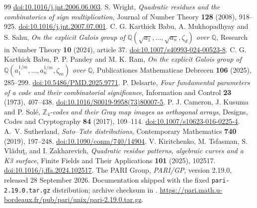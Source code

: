\documentclass[11pt]{article}
\theoremstyle{definition}\newtheorem{definition}[theorem]{Definition}
\newcommand{\Q}{\mathbb Q}
\newcommand{\Z}{\mathbb Z}
\begin{document}
\begin{thebibliography}{99}
\href{https://doi.org/10.1016/j.jnt.2006.06.003}{doi:10.1016/j.jnt.2006.06.003}.
 S. Wright,
\emph{Quadratic residues and the combinatorics of sign multiplication},
Journal of Number Theory \textbf{128} (2008), 918--925.
\href{https://doi.org/10.1016/j.jnt.2007.07.001}{doi:10.1016/j.jnt.2007.07.001}.
 C. G. Karthick Babu, A. Mukhopadhyay and S. Sahu,
\emph{On the explicit Galois group of
$\Q(\sqrt{a_1},\ldots,\sqrt{a_n},\zeta_d)$ over $\Q$},
Research in Number Theory \textbf{10} (2024), article 37.
\href{https://doi.org/10.1007/s40993-024-00523-8}{doi:10.1007/s40993-024-00523-8}.
 C. G. Karthick Babu, P. P. Pandey and M. K. Ram,
\emph{On the explicit Galois group of
$\Q(a_1^{1/m},\ldots,a_n^{1/m},\zeta_m)$ over $\Q$},
Publicationes Mathematicae Debrecen \textbf{106} (2025), 285--299.
\href{https://doi.org/10.5486/PMD.2025.9771}{doi:10.5486/PMD.2025.9771}.
 P. Delsarte,
\emph{Four fundamental parameters of a code and their combinatorial significance},
Information and Control \textbf{23} (1973), 407--438.
\href{https://doi.org/10.1016/S0019-9958(73)80007-5}{doi:10.1016/S0019-9958(73)80007-5}.
 P. J. Cameron, J. Kusuma and P. Sol\'e,
\emph{$\Z_4$-codes and their Gray map images as orthogonal arrays},
Designs, Codes and Cryptography \textbf{84} (2017), 109--114.
\href{https://doi.org/10.1007/s10623-016-0225-4}{doi:10.1007/s10623-016-0225-4}.
 A.~V. Sutherland,
\emph{Sato--Tate distributions}, Contemporary Mathematics
\textbf{740} (2019), 197--248.
\href{https://doi.org/10.1090/conm/740/14904}{doi:10.1090/conm/740/14904}.
 V. Kiritchenko, M. Tsfasman, S. Vl\u{a}du\c{t},
and I. Zakharevich,
\emph{Quadratic residue patterns, algebraic curves and a K3 surface},
Finite Fields and Their Applications \textbf{101} (2025), 102517.
\href{https://doi.org/10.1016/j.ffa.2024.102517}{doi:10.1016/j.ffa.2024.102517}.
 The PARI Group, \emph{PARI/GP}, version 2.19.0,
released 28 September 2026. Documentation shipped with the fixed
\texttt{pari-2.19.0.tar.gz} distribution; archive checksum in
.
\url{https://pari.math.u-bordeaux.fr/pub/pari/unix/pari-2.19.0.tar.gz}.
\end{thebibliography}
\end{document}
